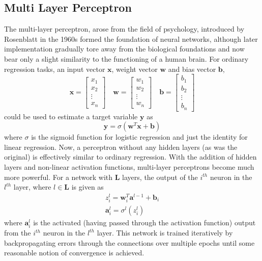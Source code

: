 \documentclass[%
 reprint,
 amsmath,amssymb,
 aps,nofootinbib
]{revtex4-2}
\begin{document}
\subsection{\label{non_param}Multi Layer Perceptron}
The multi-layer perceptron, arose from the field of psychology, introduced by Rosenblatt in the 1960s \cite{mlp} formed the foundation of neural networks, although later implementation gradually tore away from the biological foundations and now bear only a slight similarity to the functioning of a human brain. For ordinary regression tasks, an input vector $\mathbf{x}$, weight vector $\mathbf{w}$ and bias vector $\mathbf{b}$,
\[
\mathbf{x} = \begin{bmatrix}
x_1 \\
x_2 \\
\vdots \\
x_n
\end{bmatrix}
\quad
\mathbf{w} = \begin{bmatrix}
w_1 \\
w_2 \\
\vdots \\
w_n
\end{bmatrix}
\quad
\mathbf{b} = \begin{bmatrix}
b_1 \\
b_2 \\
\vdots \\
b_n
\end{bmatrix}
\]
could be used to estimate a target variable $\mathbf{y}$ as 
\[
\mathbf{y} = \sigma(\mathbf{w}^T\mathbf{x}+\mathbf{b})
\]
where $\sigma$ is the sigmoid function for logistic regression and just the identity for linear regression. Now, a perceptron without any hidden layers (as was the original) is effectively similar to ordinary regression. With the addition of hidden layers and non-linear activation functions, multi-layer perceptrons become much more powerful. For a network with $\mathbf{L}$ layers, the output of the $i^{th}$ neuron in the $l^{th}$ layer, where $l \in \mathbf{L}$ is given as
\begin{gather}
z^{l}_{i} = \mathbf{w}^{T}_{i}\mathbf{a}^{l-1} + \mathbf{b}_i\\
\mathbf{a}^{l}_i = \sigma^{l}(z^{l}_{i})
\end{gather}
where $\mathbf{a}^{l}_{i}$ is the activated (having passed through the activation function) output from the $i^{th}$ neuron in the $l^{th}$ layer. This network is trained iteratively by backpropagating \cite{backprop} errors through the connections over multiple epochs until some reasonable notion of convergence is achieved.\\
\end{document}
